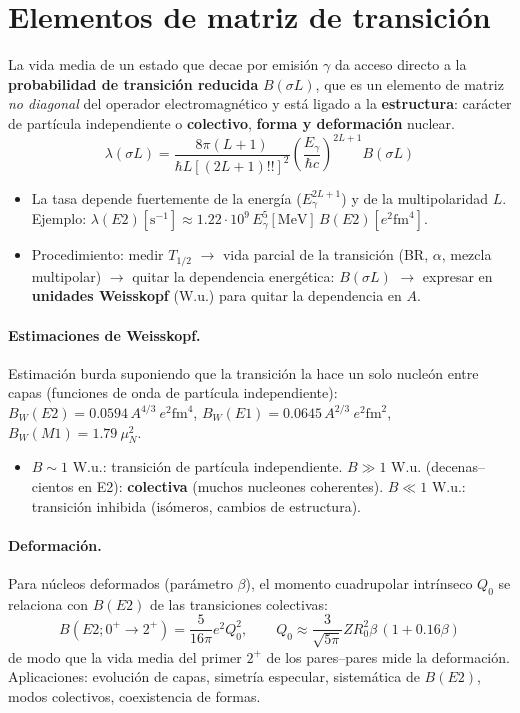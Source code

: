 \section{Elementos de matriz de transición}
\begin{clave}
La vida media de un estado que decae por emisión $\gamma$ da acceso directo a la \textbf{probabilidad de transición reducida} $B(\sigma L)$, que es un
elemento de matriz \emph{no diagonal} del operador electromagnético y está ligado a la \textbf{estructura}: carácter de partícula independiente o
\textbf{colectivo}, \textbf{forma y deformación} nuclear.
\[
\lambda(\sigma L)=\frac{8\pi(L+1)}{\hbar L[(2L+1)!!]^2}\left(\frac{E_\gamma}{\hbar c}\right)^{2L+1}B(\sigma L)
\]
\begin{itemize}
\item La tasa depende fuertemente de la energía ($E_\gamma^{2L+1}$) y de la multipolaridad $L$. Ejemplo: $\lambda(E2)[\mathrm{s^{-1}}]\approx1.22\cdot10^9\,E_\gamma^5[\mathrm{MeV}]\,B(E2)[e^2\mathrm{fm}^4]$.
\item Procedimiento: medir $T_{1/2}$ $\to$ vida parcial de la transición (BR, $\alpha$, mezcla multipolar) $\to$ quitar la dependencia energética: $B(\sigma L)$
$\to$ expresar en \textbf{unidades Weisskopf} (W.u.) para quitar la dependencia en $A$.
\end{itemize}
\end{clave}

\paragraph{Estimaciones de Weisskopf.} Estimación burda suponiendo que la transición la hace un solo nucleón entre capas
(funciones de onda de partícula independiente): $B_W(E2)=0.0594\,A^{4/3}\ e^2\mathrm{fm}^4$, $B_W(E1)=0.0645\,A^{2/3}\ e^2\mathrm{fm}^2$, $B_W(M1)=1.79\ \mu_N^2$.
\begin{itemize}
\item $B\sim1$ W.u.: transición de partícula independiente. $B\gg1$ W.u. (decenas--cientos en E2): \textbf{colectiva} (muchos nucleones coherentes).
$B\ll1$ W.u.: transición inhibida (isómeros, cambios de estructura).
\end{itemize}

\paragraph{Deformación.} Para núcleos deformados (parámetro $\beta$), el momento cuadrupolar intrínseco $Q_0$ se relaciona con $B(E2)$ de las transiciones
colectivas:
\[
B(E2;0^+\to2^+)=\frac{5}{16\pi}e^2Q_0^2,\qquad Q_0\approx\frac{3}{\sqrt{5\pi}}ZR_0^2\beta\,(1+0.16\beta)
\]
de modo que la vida media del primer $2^+$ de los pares--pares mide la deformación. Aplicaciones: evolución de capas, simetría especular,
sistemática de $B(E2)$, modos colectivos, coexistencia de formas.

